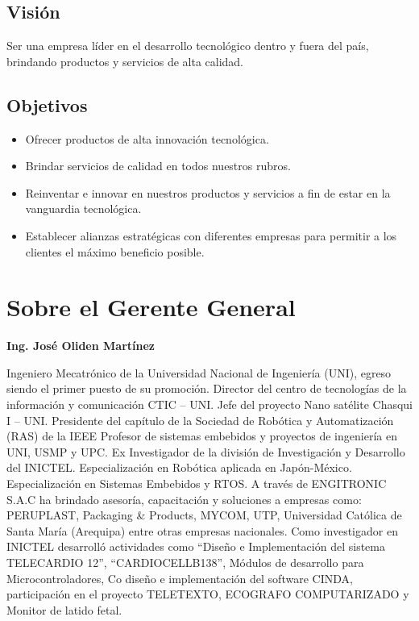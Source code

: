 \subsection{Visión}
Ser una empresa líder en el desarrollo tecnológico dentro y fuera del país, brindando productos y servicios de alta calidad.

\subsection{Objetivos}
\begin{itemize}
  \item Ofrecer productos de alta innovación tecnológica.
  \item Brindar servicios de calidad en todos nuestros rubros.
  \item Reinventar e innovar en nuestros productos y servicios a fin de estar en la vanguardia tecnológica.
  \item Establecer alianzas estratégicas con diferentes empresas para permitir a los clientes el máximo beneficio posible. 
\end{itemize}


\section{Sobre el Gerente General}
\textbf{Ing. José Oliden Martínez}

Ingeniero Mecatrónico de la Universidad Nacional de Ingeniería (UNI), egreso siendo el primer puesto de su promoción. Director del centro de tecnologías de la información y comunicación CTIC – UNI. Jefe del proyecto Nano satélite Chasqui I – UNI. Presidente del capítulo de la Sociedad de Robótica y Automatización (RAS) de la IEEE Profesor de sistemas embebidos y proyectos de ingeniería en UNI, USMP y UPC. Ex Investigador de la división de Investigación y Desarrollo del INICTEL. Especialización en Robótica aplicada en Japón-México. Especialización en Sistemas Embebidos y RTOS. A través de ENGITRONIC S.A.C ha brindado asesoría, capacitación y soluciones a empresas como: PERUPLAST, Packaging \& Products, MYCOM, UTP, Universidad Católica de Santa María (Arequipa) entre otras empresas nacionales. Como investigador en INICTEL desarrolló actividades como “Diseño e Implementación del sistema TELECARDIO 12”, “CARDIOCELLB138”, Módulos de desarrollo para Microcontroladores, Co diseño e implementación del software CINDA, participación en el proyecto TELETEXTO, ECOGRAFO COMPUTARIZADO y Monitor de latido fetal.


